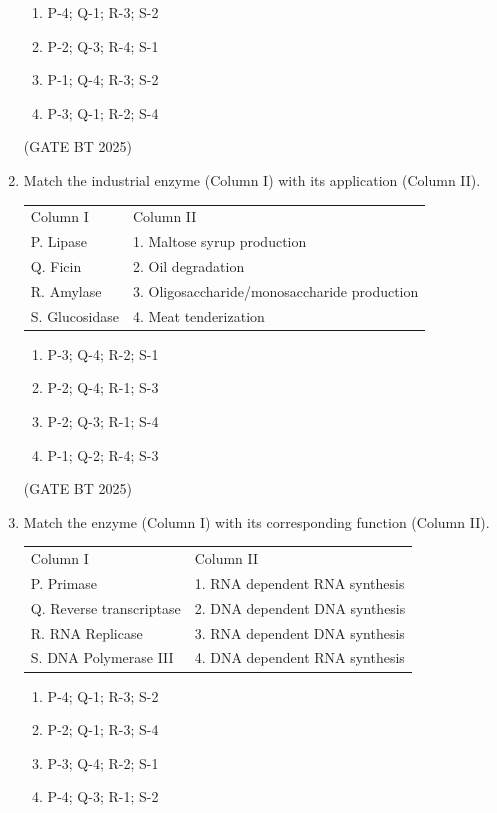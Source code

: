 \documentclass[journal,12pt,onecolumn]{IEEEtran}
\theoremstyle{remark}
\begin{document}
\begin{enumerate}
\begin{enumerate}
    \item P-4; Q-1; R-3; S-2
    \item P-2; Q-3; R-4; S-1
    \item P-1; Q-4; R-3; S-2
    \item P-3; Q-1; R-2; S-4
\end{enumerate}
\hfill(GATE BT 2025)

\item Match the industrial enzyme (Column I) with its application (Column II).

\begin{tabular}{ll}
Column I & Column II \\
P. Lipase & 1. Maltose syrup production \\
Q. Ficin & 2. Oil degradation \\
R. Amylase & 3. Oligosaccharide/monosaccharide production \\
S. Glucosidase & 4. Meat tenderization \\
\end{tabular}

\begin{enumerate}
    \item  P-3; Q-4; R-2; S-1 
    \item  P-2; Q-4; R-1; S-3 
    \item  P-2; Q-3; R-1; S-4 
    \item  P-1; Q-2; R-4; S-3
\end{enumerate}
\hfill (GATE BT 2025)

\item Match the enzyme (Column I) with its corresponding function (Column II).

\begin{tabular}{ll}
Column I & Column II \\
P. Primase & 1. RNA dependent RNA synthesis \\
Q. Reverse transcriptase & 2. DNA dependent DNA synthesis \\
R. RNA Replicase & 3. RNA dependent DNA synthesis \\
S. DNA Polymerase III & 4. DNA dependent RNA synthesis \\
\end{tabular}

\begin{enumerate}
\item P-4; Q-1; R-3; S-2 \hfill
\item P-2; Q-1; R-3; S-4 \hfill
\item P-3; Q-4; R-2; S-1 \hfill
\item P-4; Q-3; R-1; S-2
\end{enumerate}


\end{enumerate}
\end{document}
